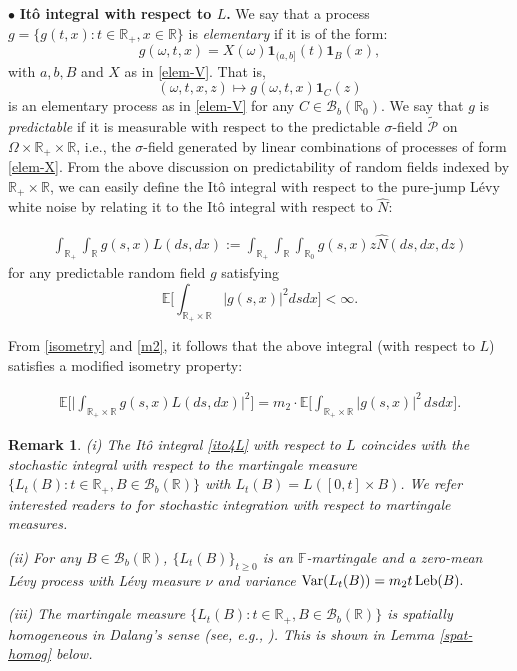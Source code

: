 \documentclass[letterpaper, 11pt,  reqno]{amsart}
\newcommand{\wh}{\widehat}
\newtheorem{remark}[theorem]{Remark}
\newcommand{\noi}{\noindent}
\newcommand{\R}{\mathbb{R}}
\newcommand{\bul}{\bullet}
\newcommand{\bE}{\mathbb{E}}
\newcommand{\bR}{\mathbb{R}}
\newcommand{\cB}{\mathcal{B}}
\newcommand{\cP}{\mathcal{P}}
\newcommand{\E}{\mathbb{E}}
\newcommand{\s}{\sigma}
\renewcommand{\o}{\omega}
\renewcommand{\O}{\Omega}
\newcommand{\ind}{\mathbf 1}
\numberwithin{equation}{section}
\numberwithin{theorem}{section}
\begin{document}
\noi
$\bul$ {\bf It\^o integral with respect to $L$.}
We say that a process $g=\{g(t,x):t \in \bR_{+},x \in \bR\}$ is {\em elementary} if it is of the form:
\begin{equation}
\label{elem-X}
g(\omega,t,x)=X(\omega) \ind_{(a,b]}(t) \ind_{B} (x),
\end{equation}
with $a,b,B$ and $X$ as in \eqref{elem-V}. 
That is,
\[
(\o, t, x, z)\mapsto g(\o,t, x)\ind_C(z)
\]
is an elementary process as in \eqref{elem-V} for any $C\in\cB_b(\R_0)$.
We say that  $g$ is {\em predictable} if it is measurable 
with respect to the predictable $\s$-field $\widetilde{\cP}$ 
on $\Omega \times \bR_{+} \times \bR$, i.e., the $\s$-field generated by 
linear combinations of processes of form \eqref{elem-X}. 
From the above discussion on predictability of random fields indexed by $\R_+\times\R$, 
we can easily define the It\^o integral with respect to the pure-jump L\'evy white noise by relating 
it to the It\^o integral with respect to $\wh{N}$:

\noi
\begin{align} \label{ito4L}
\int_{\R_+} \int_\R  g(s,x) L(ds,dx) := \int_{\R_+} \int_{\R} \int_{\bR_0} g(s,x)z \wh{N}(ds,dx,dz)
\end{align}
for any  predictable random field  $g$ satisfying 
\[
\E \bigg[ \int_{\R_+\times\R} | g(s, x) |^2 dsdx \bigg] < \infty.
\]  


\noi
From \eqref{isometry} and   \eqref{m2}, it follows that the above integral (with respect to $L$)
satisfies a modified isometry property:
 
\noi
\begin{align}\label{m_iso}
\bE\Big[ \big|\int_{\R_+\times \R}g(s,x)L(ds,dx) \big|^2\Big] 
= m_2\cdot  \bE \Big[\int_{\R_+\times\R} |g(s,x)|^2 \, dsdx \Big].
\end{align}

\begin{remark}\label{REM23}
\rm
(i) The It\^o integral \eqref{ito4L} 
with respect to $L$ coincides with the stochastic integral with respect to the  
{\em martingale measure} $\{L_t(B): t \in\R_+,B\in \cB_b(\R)\}$
with $L_t(B)=L([0,t] \times B)$.
We refer interested readers to \cite{walsh86}
 for stochastic integration with respect to martingale measures.

\smallskip

\noi
(ii) For any $B \in \cB_b(\R)$, $\{L_t(B)\}_{t\geq 0}$ is  an $\mathbb{F}$-martingale and a zero-mean L\'evy process with L\'evy measure $\nu$ and variance
$
{\rm Var} (L_t(B)   )  =m_2 t \, {\rm Leb}(B).
$

\smallskip

\noi
(iii) The martingale measure $\{L_t(B): t\in\R_+, B\in \cB_b(\R)\}$
  is {\em spatially homogeneous}  in Dalang's sense (see, e.g., \cite{dalang99}).
  This is shown  in  Lemma \ref{spat-homog} below.

\end{remark}
\end{document}
